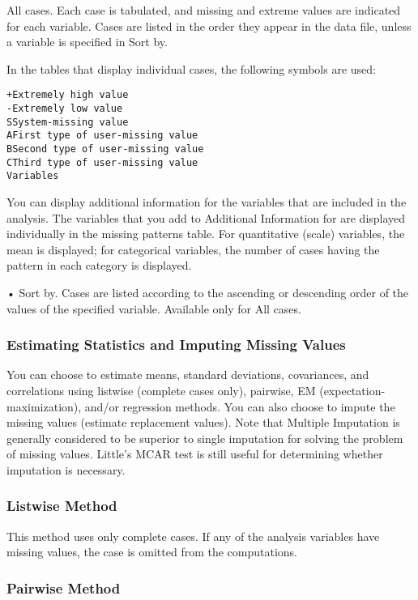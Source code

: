 All cases. Each case is tabulated, and missing and extreme values are indicated for each variable. Cases are listed in the order they appear in the data file, unless a variable is specified in Sort by.

In the tables that display individual cases, the following symbols are used:
\begin{framed}
\begin{verbatim}
+Extremely high value
-Extremely low value
SSystem-missing value
AFirst type of user-missing value
BSecond type of user-missing value
CThird type of user-missing value
Variables
\end{verbatim}
\end{framed}
You can display additional information for the variables that are included in the analysis. The variables that you add to Additional Information for are displayed individually in the missing patterns table. For quantitative (scale) variables, the mean is displayed; for categorical variables, the number of cases having the pattern in each category is displayed.

• Sort by. Cases are listed according to the ascending or descending order of the values of the specified variable. Available only for All cases.

\subsubsection*{Estimating Statistics and Imputing Missing Values}

You can choose to estimate means, standard deviations, covariances, and correlations using listwise (complete cases only), pairwise, EM (expectation-maximization), and/or regression methods. You can also choose to impute the missing values (estimate replacement values). Note that Multiple Imputation is generally considered to be superior to single imputation for solving the problem of missing values. Little's MCAR test is still useful for determining whether imputation is necessary.

\subsubsection*{Listwise Method}

This method uses only complete cases. If any of the analysis variables have missing values, the case is omitted from the computations.

\subsubsection*{Pairwise Method}

